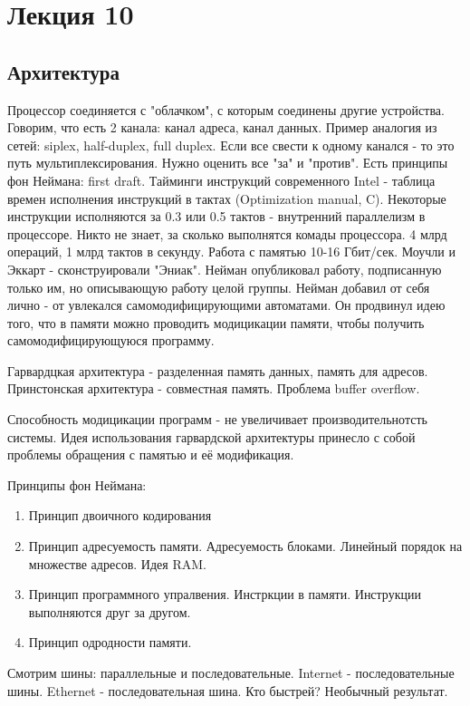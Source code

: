 \section{Лекция 10}
\subsection{Архитектура}
Процессор соединяется с "облачком", с которым соединены другие устройства. Говорим, что есть 2 канала: канал адреса, канал данных. Пример аналогия из сетей: siplex, half-duplex, full duplex.
Если все свести к одному канался - то это путь мультиплексирования. Нужно оценить все "за" и "против". Есть принципы фон Неймана: first draft. Тайминги инструкций современного Intel - таблица времен исполнения инструкций в тактах (Optimization manual, C). Некоторые инструкции исполняются за 0.3 или 0.5 тактов - внутренний параллелизм в процессоре. Никто не знает, за сколько выполнятся комады процессора. 4 млрд операций, 1 млрд тактов в секунду. Работа с памятью 10-16 Гбит/сек. Моучли и Эккарт - сконструировали "Эниак". Нейман опубликовал работу, подписанную только им, но описывающую работу целой группы. Нейман добавил от себя лично - от увлекался самомодифицирующими автоматами. Он продвинул идею того, что в памяти можно проводить модицикации памяти, чтобы получить самомодифицирующуюся программу. 

\begin{rem}
Гарвардцкая архитектура - разделенная память данных, память для адресов. Принстонская архитектура - совместная память. Проблема buffer overflow. 
\end{rem}

Способность модицикации программ - не увеличивает производительнотсть системы. Идея использования гарвардской архитектуры принесло с собой проблемы обращения с памятью и её модификация.

Принципы фон Неймана: 
\begin{enumerate}
\item Принцип двоичного кодирования
\item Принцип адресуемость памяти. Адресуемость блоками. Линейный порядок на множестве адресов. Идея RAM.
\item Принцип программного упралвения. Инстркции в памяти. Инструкции выполняются друг за другом.
\item Принцип одродности памяти.
\end{enumerate}

Смотрим шины: параллельные и последовательные. Internet - последовательные шины. Ethernet - последовательная шина. Кто быстрей? Необычный результат.

